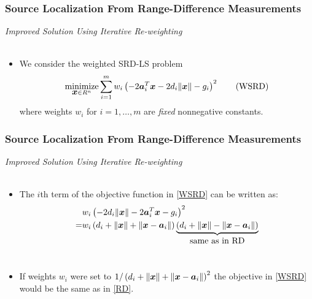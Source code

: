 \documentclass [t] {beamer} %
\begin{document}
\begin{frame} %
\frametitle{Source Localization From Range-Difference Measurements} 
{\large \textit{Improved Solution Using Iterative Re-weighting}} \\~\\
\normalsize
\begin{itemize}

\phantom{m}

\item 
We consider the weighted SRD-LS problem
\begin{equation} \label{WSRD}
\mathop{\mbox{minimize}}_{{\mbox{\boldmath$x$}} \in R^n} \sum_{i=1}^m w_i\left(-2\mbox{\boldmath$a$}_i^T\mbox{\boldmath$x$}-2d_i\|\mbox{\boldmath$x$}\|-g_i\right)^2 \tag{WSRD}
\end{equation}
where weights $w_i$ for $i=1,\ldots,m$ are \textit{fixed} nonnegative constants. 
\end{itemize}
\end{frame}



\begin{frame} %
\frametitle{Source Localization From Range-Difference Measurements} %
{\large \textit{Improved Solution Using Iterative Re-weighting}} 
\\~\\
\normalsize
\begin{itemize}
\item <1->
The $i$th term of the objective function in \eqref{WSRD} can be written as:
\begin{equation}
\nonumber
\begin{aligned}
&w_i\left(-2d_i\|\mbox{\boldmath$x$}\|-2\mbox{\boldmath$a$}_i^T\mbox{\boldmath$x$}-g_i\right)^2 \\
=&w_i\left(d_i+\|\mbox{\boldmath$x$}\|+\|\mbox{\boldmath$x$}-\mbox{\boldmath$a$}_i\|\right)\underbrace{\left(d_i+\|\mbox{\boldmath$x$}\|-\|\mbox{\boldmath$x$}-\mbox{\boldmath$a$}_i\|\right)}_{\mbox{same as in RD}}
\end{aligned}
\end{equation}
\\

\phantom{m} 
\item 
If weights $w_i$ were set to $1/\left(d_i+\|\mbox{\boldmath$x$}\|+\|\mbox{\boldmath$x$}-\mbox{\boldmath$a$}_i\|\right)^2$  the objective in \eqref{WSRD} would be the same as in \eqref{RD}. 
\end{itemize}
\end{frame}
\end{document}
